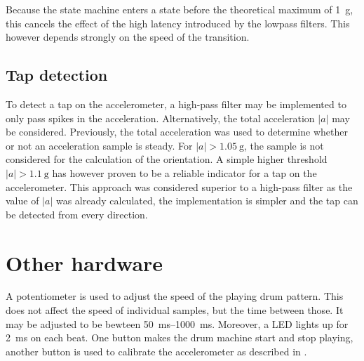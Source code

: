 \documentclass[a4paper, 12pt]{article}
\begin{document}
Because the state machine enters a state before the theoretical maximum of \SI{1}{\gram}, this cancels the effect of the high latency introduced by the lowpass filters. This however depends strongly on the speed of the transition.

\subsection{Tap detection}
To detect a tap on the accelerometer, a high-pass filter may be implemented to only pass spikes in the acceleration. Alternatively, the total acceleration $|a|$ may be considered. Previously, the total acceleration was used to determine whether or not an acceleration sample is steady. For $|a| > \SI{1.05}{\gram}$, the sample is not considered for the calculation of the orientation. A simple higher threshold $|a| > \SI{1.1}{\gram}$ has however proven to be a reliable indicator for a tap on the accelerometer. This approach was considered superior to a high-pass filter as the value of $|a|$ was already calculated, the implementation is simpler and the tap can be detected from every direction.

\section{Other hardware}
A potentiometer is used to adjust the speed of the playing drum pattern. This does not affect the speed of individual samples, but the time between those. It may be adjusted to be bewteen \SIrange{50}{1000}{\milli\second}. Moreover, a LED lights up for \SI{2}{\milli\second} on each beat. One button makes the drum machine start and stop playing, another button is used to calibrate the accelerometer as described in .

\sloppy
\printbibliography
\end{document}
